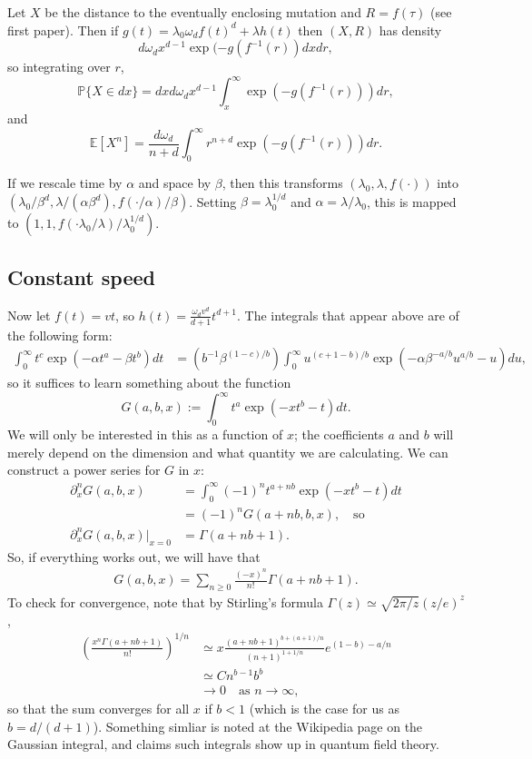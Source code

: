 \documentclass{article}
\renewcommand{\P}{\mathbb{P}}
\newcommand{\E}{\mathbb{E}}
\begin{document}
Let $X$ be the distance to the eventually enclosing mutation and $R=f(\tau)$ (see first paper).
Then if $g(t) = \lambda_0 \omega_d f(t)^d + \lambda h(t)$ then $(X,R)$ has density
\[
    d \omega_d x^{d-1} \exp(-g(f^{-1}(r)) dx dr,
\]
so integrating over $r$,
\[
    \P\{ X \in dx \} = dx d \omega_d x^{d-1} \int_x^\infty \exp( - g(f^{-1}(r)) ) dr ,
\]
and
\[
    \E[ X^n ] = \frac{d\omega_d}{n+d} \int_0^\infty r^{n+d} \exp( - g(f^{-1}(r)) ) dr .
\]

If we rescale time by $\alpha$ and space by $\beta$, 
then this transforms $(\lambda_0, \lambda, f(\cdot))$ into $(\lambda_0/\beta^d, \lambda/(\alpha \beta^d), f(\cdot/\alpha)/\beta)$.  
Setting $\beta = \lambda_0^{1/d}$ and $\alpha = \lambda / \lambda_0$, this is mapped to $(1,1,f(\cdot \lambda_0/\lambda)/\lambda_0^{1/d})$.

\subsection{Constant speed}

Now let $f(t) = vt$, so $h(t) = \frac{ \omega_d v^d }{ d+1 } t^{d+1}$.
The integrals that appear above are of the following form:
\begin{align}
  \int_0^\infty t^c \exp \left( - \alpha t^a - \beta t^b \right) dt 
            &= \left( b^{-1} \beta^{ (1-c)/b } \right) \int_0^\infty u^{(c+1-b)/b} \exp\left( - \alpha \beta^{-a/b} u^{a/b} - u \right) du ,
\end{align}
so it suffices to learn something about the function
\begin{equation}
    G(a,b,x) := \int_0^\infty  t^a \exp\left( -x t^b - t \right) dt .
\end{equation}
We will only be interested in this as a function of $x$; 
the coefficients $a$ and $b$ will merely depend on the dimension and what quantity we are calculating.
We can construct a power series for $G$ in $x$:
\begin{align}
    \partial_x^n G(a,b,x) &= \int_0^\infty (-1)^n t^{a+nb} \exp\left( -x t^b - t \right) dt \\
            &= (-1)^n G(a+nb,b,x) , \quad \mbox{so} \\
    \partial_x^n G(a,b,x) \vert_{x=0} &= \Gamma(a+nb+1) .
\end{align}
So, if everything works out, we will have that
\begin{align}
    G(a,b,x) = \sum_{n \ge 0} \frac{(-x)^n}{n!} \Gamma(a+nb+1) .
\end{align}
To check for convergence, note that by Stirling's formula $\Gamma(z) \simeq \sqrt{2\pi/z} (z/e)^z$,
\begin{align}
    \left( \frac{x^n \Gamma(a+nb+1) }{ n! } \right)^{1/n} &\simeq x \frac{ (a+nb+1)^{b+(a+1)/n} }{ (n+1)^{1+1/n} } e^{(1-b)-a/n} \\
        &\simeq C n^{b-1} b^b \\
        &\to 0  \quad \mbox{as } n \to \infty ,
\end{align}
so that the sum converges for all $x$ if $b<1$ (which is the case for us as $b=d/(d+1)$).
Something simliar is noted at the Wikipedia page on the Gaussian integral, and claims such integrals show up in quantum field theory.
\end{document}
